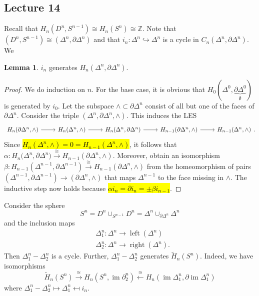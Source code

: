 \documentclass[10pt,letterpaper,cm]{nupset}
\theoremstyle{definition}
\theoremstyle{theorem}
\newtheorem{lemma}[definition]{Lemma}
\theoremstyle{remark}
\newcommand{\Z}{\mathbb Z}
\newcommand{\1}{\mathbb{1}}
\newcommand{\0}{\vec 0}
\DeclareMathOperator{\im}{im}
\DeclareMathOperator{\leftt}{left}
\DeclareMathOperator{\rightt}{right}
\begin{document}
\subsection{Lecture 14}

Recall that $H_n(D^n, S^{n-1}) \cong H_n(S^n) \cong \Z$. Note that $\left(D^n, S^{n-1}\right) \cong \left(\Delta^n, \partial{\Delta^n}\right)$ and that $i_n : \Delta^n \hookrightarrow \Delta^n$ is a cycle in $C_n(\Delta^n, \partial{\Delta^n})$. We

\begin{lemma}
$i_n$ generates $H_n(\Delta^n, \partial{\Delta^n})$.
\end{lemma}
\begin{proof}
We do induction on $n$. For the base case, it is obvious that $H_0(\Delta^0, \underbrace{\partial{\Delta^0}}_{\emptyset})$ is generated by $i_0$. Let the subspace $\wedge \subset \partial{\Delta^n}$ consist of all but one of the faces of $\partial{\Delta^n}$. Consider the triple $\left(\Delta^n, \partial{\Delta^n}, \wedge\right)$. This induces the LES
\[
\begin{tikzcd}
{H_n(\partial{\Delta^n, \wedge})} \arrow[r] & {H_n(\Delta^n, \wedge)} \arrow[r] & {H_n(\Delta^n, \partial{\Delta^n)}} \arrow[r] & {H_{n-1}(\partial{\Delta^n}, \wedge)} \arrow[r] & {H_{n-1}(\Delta^n, \wedge)}
\end{tikzcd}
.\] Since \hl{$H_n(\Delta^n, \wedge) =0 = H_{n-1}(\Delta^n, \wedge)$}, it follows that $\alpha: H_n(\Delta^n, \partial{\Delta^n)} \overset{\cong}{\longrightarrow}  H_{n-1}(\partial{\Delta^n}, \wedge)$. Moreover, obtain an isomorphism $\beta: H_{n-1}(\Delta^{n-1}, \partial{\Delta^{n-1}}) \overset{\cong}{\longrightarrow} H_{n-1}(\partial{\Delta^n}, \wedge)$ from the homeomorphism of pairs $\left(\Delta^{n-1}, \partial{\Delta^{n-1}}\right) \to \left(\partial{\Delta^n}, \wedge\right)$ that maps $\Delta^{n-1}$ to the face missing in $\wedge$. The inductive step now holds because \hl{$\alpha{i_n} = \partial{i_n}= \pm \beta{i_{n-1}}$}.
\end{proof}

\smallskip

Consider the sphere $$S^n = D^n \cup_{S^{n-1}} D^n= \Delta^n \cup_{\partial{\Delta^n}}\Delta^n$$ and the inclusion maps 
\begin{align*}
& \Delta^n_1 :\Delta^n \to \leftt(\Delta^n)
\\ &  \Delta^n_2 :\Delta^n \to \rightt(\Delta^n).
\end{align*} Then $\Delta^n_1 - \Delta^n_2$ is a cycle. Further, $\Delta_1^n -\Delta_2^n$ generates $\widetilde{H}_n(S^n)$. Indeed, we have isomorphisms 
\[
\widetilde{H}_n(S^n) \overset{\cong}{\longrightarrow} H_n(S^n, \im{\partial_2^n}) \overset{\cong}{\longleftarrow} H_n(\im{\Delta^n_1}, \partial{\im{\Delta_1^n}})
\] where $\Delta_1^n -\Delta_2^n \mapsto \Delta^n_1 \mapsfrom i_n$.
\end{document}

